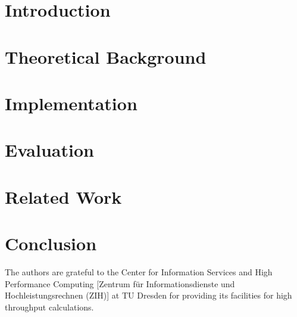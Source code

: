 \documentclass[sigconf,screen,authorversion,pbalance]{acmart}
\begin{document}




\maketitle


\section{Introduction}


\section{Theoretical Background}
\label{sct:theory}


\section{Implementation}
\label{sct:implementation}


\section{Evaluation}
\label{sct:evaluation}


\section{Related Work}
\label{sct:related}


\section{Conclusion}
\label{sct:discussion}


\begin{acks}
The authors are grateful to the Center for Information Services and High Performance Computing [Zentrum für Informationsdienste und Hochleistungsrechnen (ZIH)] at TU Dresden for providing its facilities for high throughput calculations.
\end{acks}



\end{document}
